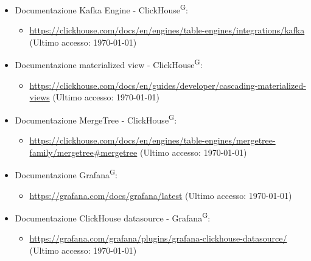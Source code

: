 \documentclass[8pt]{article}
\newcommand{\glossterm}[1]{#1\textsuperscript{G}} %
\begin{document}
\begin{itemize}
    \begin{itemize}
	\setlength\itemsep{0em}
		\item \href{https://clickhouse.com/docs/en/intro}{\color{myblue}https://clickhouse.com/docs/en/intro} (Ultimo accesso: \today)
	\end{itemize}
    \item Documentazione Kafka Engine - \glossterm{ClickHouse}:
    \begin{itemize}
	\setlength\itemsep{0em}
		\item \href{https://clickhouse.com/docs/en/engines/table-engines/integrations/kafka}{\color{myblue}https://clickhouse.com/docs/en/engines/table-engines/integrations/kafka} (Ultimo accesso: \today)
	\end{itemize}
    \item Documentazione materialized view - \glossterm{ClickHouse}:
    \begin{itemize}
	\setlength\itemsep{0em}
		\item \href{https://clickhouse.com/docs/en/guides/developer/cascading-materialized-views}{\color{myblue}https://clickhouse.com/docs/en/guides/developer/cascading-materialized-views} (Ultimo accesso: \today)
	\end{itemize}
    \item Documentazione MergeTree - \glossterm{ClickHouse}:
    \begin{itemize}
	\setlength\itemsep{0em}
		\item \href{https://clickhouse.com/docs/en/engines/table-engines/mergetree-family/mergetree#mergetree}{\color{myblue}https://clickhouse.com/docs/en/engines/table-engines/mergetree-family/mergetree\#mergetree} (Ultimo accesso: \today)
	\end{itemize}
    \item Documentazione \glossterm{Grafana}:
    \begin{itemize}
	\setlength\itemsep{0em}
		\item \href{https://grafana.com/docs/grafana/latest}{\color{myblue}https://grafana.com/docs/grafana/latest} (Ultimo accesso: \today)
	\end{itemize}
    \item Documentazione ClickHouse datasource - \glossterm{Grafana}:
    \begin{itemize}
	\setlength\itemsep{0em}
		\item \href{https://grafana.com/grafana/plugins/grafana-clickhouse-datasource/}{\color{myblue}https://grafana.com/grafana/plugins/grafana-clickhouse-datasource/} (Ultimo accesso: \today)

\end{itemize}
\end{itemize}
\end{document}
